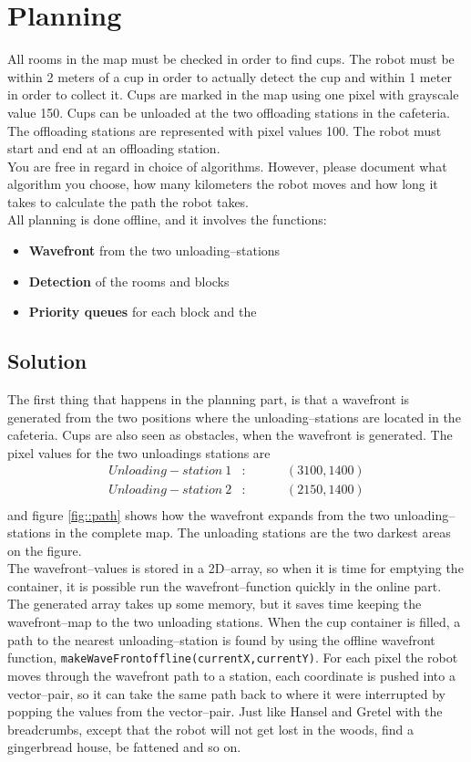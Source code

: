 \section{Planning}
\label{sec::planning}
All rooms in the map must be checked in order to find cups. The robot must be within 2 meters of a cup in order to actually detect the cup and within 1 meter in order to collect it. Cups are marked in the map using one pixel with grayscale value 150. Cups can be unloaded at the two offloading stations in the cafeteria. The offloading stations are represented with pixel values 100. The robot must start and end at an offloading station.\\[0.2cm]
You are free in regard in choice of algorithms. However, please document what algorithm you choose, how many kilometers the robot moves and how long it takes to calculate the path the robot takes.\\[0.2cm]
All planning is done offline, and it involves the functions:
\begin{itemize}\itemsep-2pt
\item \textbf{Wavefront} from the two unloading--stations
\item \textbf{Detection} of the rooms and blocks
\item \textbf{Priority queues} for each block and the
\end{itemize}

\subsection{Solution}
The first thing that happens in the planning part, is that a wavefront is generated from the two positions where the unloading--stations are located in the cafeteria. Cups are also seen as obstacles, when the wavefront is generated. The pixel values for the two unloadings stations are 
\begin{eqnarray*}
Unloading-station\: 1&:& \hspace{1cm}(3100,1400) \\
Unloading-station\: 2&:& \hspace{1cm}(2150,1400) \\
\end{eqnarray*}
and figure \ref{fig::path} shows how the wavefront expands from the two unloading--stations in the complete map. The unloading stations are the two darkest areas on the figure.\\[.2cm]
The wavefront--values is stored in a 2D--array, so when it is time for emptying the container, it is possible run the wavefront--function quickly in the online part. The generated array takes up some memory, but it saves time keeping the wavefront--map to the two unloading stations. When the cup container is filled, a path to the nearest unloading--station is found by using the offline wavefront function, \lstinline|makeWaveFrontoffline(currentX,currentY)|. For each pixel the robot moves through the wavefront path to a station, each coordinate is pushed into a vector--pair, so it can take the same path back to where it were interrupted by popping the values from the vector--pair. Just like Hansel and Gretel with the breadcrumbs, except that the robot will not get lost in the woods, find a gingerbread house, be fattened and so on.  

